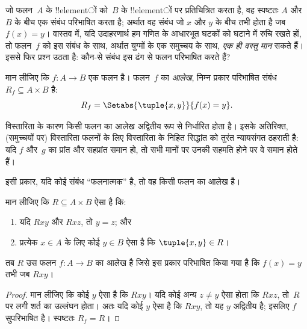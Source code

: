 \documentclass[../../../include/open-logic-section]{subfiles}
\begin{document}


\begin{explain}
जो फलन~$A$ के !!{element}ों को~$B$ के !!{element}ों पर प्रतिचित्रित करता है,
वह स्पष्टतः $A$ और~$B$ के बीच एक संबंध परिभाषित करता है; अर्थात वह संबंध जो
$x$ और $y$ के बीच तभी होता है जब $f(x) = y$। वास्तव में, यदि उदाहरणार्थ हम
गणित के आधारभूत घटकों को घटाने में रुचि रखते हों, तो फलन~$f$ को इस संबंध के
साथ, अर्थात युग्मों के एक समुच्चय के साथ, \emph{एक ही वस्तु मान} सकते हैं। इससे
फिर प्रश्न उठता है: कौन-से संबंध इस ढंग से फलन परिभाषित करते हैं?
\end{explain}

\begin{defn}[फलन का आलेख] मान लीजिए कि $f\colon A \to B$ एक फलन है।
फलन~$f$ का \emph{आलेख}, निम्न प्रकार परिभाषित संबंध
$R_f \subseteq A \times B$ है:
\[
R_f = \Setabs{\tuple{x,y}}{f(x) = y}.
\]
\end{defn}

\begin{explain}
विस्तारिता के कारण किसी फलन का आलेख अद्वितीय रूप से निर्धारित होता है। इसके
अतिरिक्त, (समुच्चयों पर) विस्तारिता फलनों के लिए विस्तारिता के निहित सिद्धांत
को तुरंत न्यायसंगत ठहराती है: यदि $f$ और~$g$ का प्रांत और सहप्रांत समान हो,
तो सभी मानों पर उनकी सहमति होने पर वे समान होते हैं।

इसी प्रकार, यदि कोई संबंध “फलनात्मक” है, तो वह किसी फलन का आलेख है।
\end{explain}

\begin{prop}
मान लीजिए कि $R \subseteq A \times B$ ऐसा है कि:
\begin{enumerate}
\item यदि $Rxy$ और $Rxz$, तो $y = z$; और
\item प्रत्येक $x \in A$ के लिए कोई $y \in B$ ऐसा है कि $\tuple{x,
y} \in R$।
\end{enumerate}
तब $R$ उस फलन $f\colon A \to B$ का आलेख है जिसे इस प्रकार परिभाषित किया गया
है कि $f(x) = y$ तभी जब $Rxy$।
\end{prop}

\begin{proof}
मान लीजिए कि कोई $y$ ऐसा है कि $Rxy$। यदि कोई अन्य $z \neq
y$ ऐसा होता कि
$Rxz$, तो~$R$ पर लगी शर्त का उल्लंघन होता। अतः यदि कोई $y$ ऐसा है कि $Rxy$,
तो यह $y$ अद्वितीय है; इसलिए $f$ सुपरिभाषित है। स्पष्टतः $R_f = R$।
\end{proof}
\end{document}
